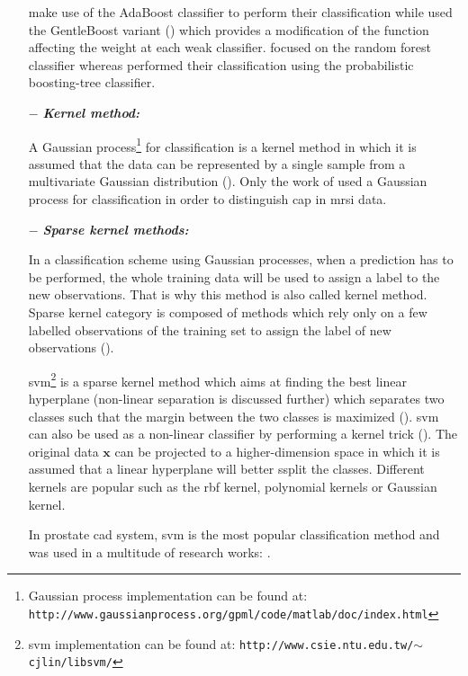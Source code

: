 \begin{enumerate}[leftmargin=*]
  \cite{Lopes2011} make use of the AdaBoost classifier to perform their classification while \cite{Litjens2014} used the GentleBoost variant (\cite{Friedman1998}) which provides a modification of the function affecting the weight at each weak classifier. \cite{Kelm2007,Litjens2014,Tiwari2012,Tiwari2013,Viswanath2009} focused on the random forest classifier whereas \cite{Tiwari2009a,Tiwari2012,Tiwari2010,Viswanath2011} performed their classification using the probabilistic boosting-tree classifier.

\item[$-$] \textbf{\textit{Kernel method:}}

  A Gaussian process\footnote{Gaussian process implementation can be found at: \texttt{http://www.\allowbreak gaussianprocess.org/gpml/code/matlab/doc/index.html}} for classification is a kernel method in which it is assumed that the data can be represented by a single sample from a multivariate Gaussian distribution (\cite{Rasmussen2005}). Only the work of \cite{Kelm2007} used a Gaussian process for classification in order to distinguish \ac{cap} in \ac{mrsi} data.

\item[$-$] \textbf{\textit{Sparse kernel methods:}}

  In a classification scheme using Gaussian processes, when a prediction has to be performed, the whole training data will be used to assign a label to the new observations. That is why this method is also called kernel method. Sparse kernel category is composed of methods which rely only on a few labelled observations of the training set to assign the label of new observations (\cite{Bishop2006}).

  \Acf{svm}\footnote{\ac{svm} implementation can be found at: \texttt{http://www.csie.ntu.edu.tw/\allowbreak $\sim$cjlin/libsvm/}} is a sparse kernel method which aims at finding the best linear hyperplane (non-linear separation is discussed further) which separates two classes such that the margin between the two classes is maximized (\cite{Vapnik1963}). \ac{svm} can also be used as a non-linear classifier by performing a kernel trick (\cite{Boser1992}). The original data $\mathbf{x}$ can be projected to a higher-dimension space in which it is assumed that a linear hyperplane will better ssplit the classes. Different kernels are popular such as the \ac{rbf} kernel, polynomial kernels or Gaussian kernel.

  In prostate \ac{cad} system, \ac{svm} is the most popular classification method and was used in a multitude of research works: \cite{Artan2009,Artan2010,Chan2003,Kelm2007,Litjens2011,Litjens2012,Liu2013,Lopes2011,Niaf2011,Niaf2012,Ozer2009,Ozer2010,Parfait2012,Peng2013,Sung2011,Tiwari2012,Vos2008,Vos2008a,Vos2010,Vos2012}.


\end{enumerate}
